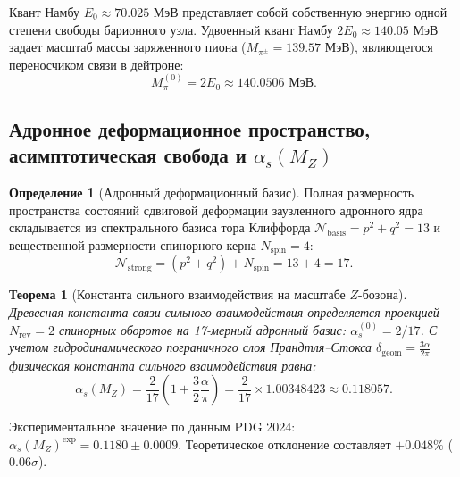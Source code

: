 \documentclass[11pt,a4paper]{article}
\newtheorem{theorem}{Теорема}
\theoremstyle{definition}
\newtheorem{definition}{Определение}
\theoremstyle{remark}
\begin{document}
Квант Намбу $E_0 \approx 70.025\text{ МэВ}$ представляет собой собственную энергию одной степени свободы барионного узла. Удвоенный квант Намбу $2E_0 \approx 140.05\text{ МэВ}$ задает масштаб массы заряженного пиона ($M_{\pi^\pm} = 139.57\text{ МэВ}$), являющегося переносчиком связи в дейтроне:
\begin{equation}
	M_\pi^{(0)} = 2 E_0 \approx 140.0506\text{ МэВ}.
	\label{eq:pion_mass_bare_nambu}
\end{equation}

\subsection{Адронное деформационное пространство, асимптотическая свобода и $\alpha_s(M_Z)$}

\begin{definition}[Адронный деформационный базис]
	Полная размерность пространства состояний сдвиговой деформации заузленного адронного ядра складывается из спектрального базиса тора Клиффорда $\mathcal{N}_{\mathrm{basis}} = p^2 + q^2 = 13$ и вещественной размерности спинорного керна $N_{\mathrm{spin}} = 4$:
\begin{equation}
	\mathcal{N}_{\mathrm{strong}} = (p^2 + q^2) + N_{\mathrm{spin}} = 13 + 4 = 17.
\label{eq:strong_basis_dimension_exact}
\end{equation}
\end{definition}

\begin{theorem}[Константа сильного взаимодействия на масштабе $Z$-бозона]
	\label{thm:alpha_s_mz_exact}
	Древесная константа связи сильного взаимодействия определяется проекцией $N_{\mathrm{rev}} = 2$ спинорных оборотов на 17-мерный адронный базис: $\alpha_s^{(0)} = 2/17$. С учетом гидродинамического пограничного слоя Прандтля--Стокса $\delta_{\mathrm{geom}} = \frac{3\alpha}{2\pi}$ физическая константа сильного взаимодействия равна:
\begin{equation}
	\alpha_s(M_Z) = \frac{2}{17} \left( 1 + \frac{3}{2}\frac{\alpha}{\pi} \right) = \frac{2}{17} \times 1.00348423 \approx 0.118057.
\label{eq:alpha_s_mz_derivation}
\end{equation}
\end{theorem}
Экспериментальное значение по данным PDG 2024: $\alpha_s(M_Z)^{\mathrm{exp}} = 0.1180 \pm 0.0009$. Теоретическое отклонение составляет $+0.048\%$ ($0.06\sigma$).
\end{document}
